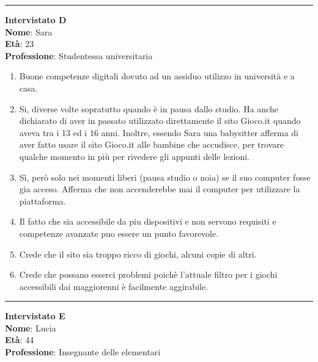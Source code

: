 \documentclass[../Report.tex]{subfiles}
\begin{document}
    \hrule
    \vspace{0.5cm}
    \textbf{Intervistato D}\\
    \textbf{Nome}: Sara\\
    \textbf{Età}: 23\\
    \textbf{Professione}: Studentessa universitaria

    \begin{enumerate}
        \item Buone competenze digitali dovuto ad un assiduo utilizzo in università e a casa.
        \item Si, diverse volte sopratutto quando è in pausa dallo studio. Ha anche dichiarato di aver in passato utilizzato direttamente il sito Gioco.it quando aveva tra i 13 ed i 16 anni. Inoltre, essendo Sara una babysitter afferma di aver fatto usare il sito Gioco.it alle bambine che accudisce, per trovare qualche momento in più per rivedere gli appunti delle lezioni. 
        \item Sì, però solo nei momenti liberi (pausa studio o noia) se il suo computer fosse gia acceso. Afferma che  non accenderebbe mai il computer per utilizzare la piattaforma.
        \item Il fatto che sia accessibile da piu dispositivi e non servono requisiti e competenze avanzate puo essere un punto favorevole.
        \item Crede che il sito sia troppo ricco di giochi, alcuni copie di altri. 
        \item Crede che possano esserci problemi poichè l'attuale filtro per i giochi accessibili dai maggiorenni è facilmente aggirabile.
        
    \end{enumerate}

    \hrule
    \vspace{0.5cm}
    \textbf{Intervistato E}\\
    \textbf{Nome}: Lucia\\
    \textbf{Età}: 44\\
    \textbf{Professione}: Insegnante delle elementari
\end{document}
